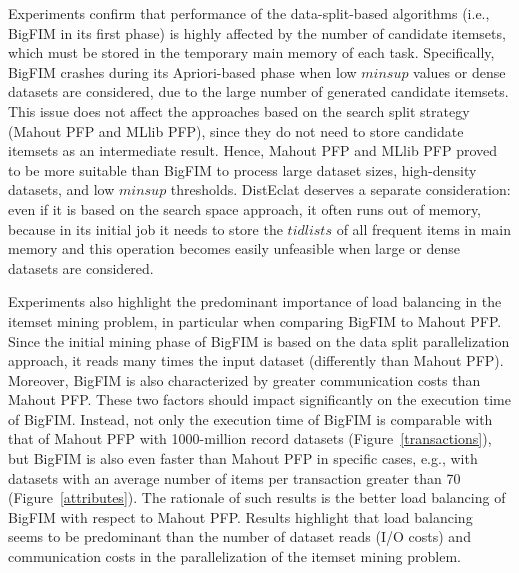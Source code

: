 
Experiments confirm that performance of the data-split-based algorithms
(i.e., BigFIM in its first phase) is highly affected by the number of candidate itemsets, 
which must be stored in the temporary main memory of each task. 
Specifically, BigFIM crashes during its Apriori-based phase when low $minsup$ values or dense datasets are considered,
due to the large number of generated candidate itemsets. 
This issue does not affect the approaches based on the search split strategy (Mahout PFP and MLlib PFP), 
since they do not need to store candidate itemsets as an intermediate result.
Hence, Mahout PFP and MLlib PFP proved to be more suitable than BigFIM to process large dataset sizes, high-density datasets, and low $minsup$ thresholds. 
DistEclat deserves a separate consideration: even if it is based on the search space approach, 
it often runs out of memory,
because in its initial job it needs to store the $tidlists$ of all frequent items in main memory 
and this operation becomes easily unfeasible when large or dense datasets are considered. 

Experiments also highlight the predominant importance of load balancing in the itemset mining problem, 
in particular when comparing BigFIM to Mahout PFP. 
Since the initial mining phase of BigFIM is based on the data split parallelization approach,
it reads many times the input dataset (differently than Mahout PFP).
Moreover, BigFIM is also characterized by greater communication costs than Mahout PFP. 
These two factors should impact significantly on the execution time of BigFIM. 
Instead, 
not only the execution time of BigFIM is comparable with that of Mahout PFP 
with 1000-million record datasets (Figure~\ref{transactions}),
but BigFIM is also even faster than Mahout PFP in specific cases, e.g., 
with datasets with an average number of items per transaction greater than 70 (Figure~\ref{attributes}).
The rationale of 	such results is the better load balancing of BigFIM with respect to Mahout PFP. 
Results highlight that load balancing seems to be predominant than the number of dataset reads (I/O costs) and communication costs in the parallelization of the itemset mining problem.






